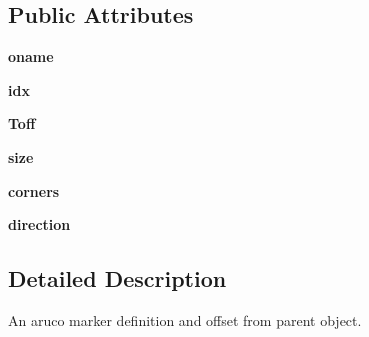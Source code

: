 \subsection*{Public Attributes}
\begin{DoxyCompactItemize}
\item 
\mbox{\label{classrnb-planning_1_1src_1_1pkg_1_1detector_1_1aruco_1_1detector_1_1_object_marker_a9fcba378061aff6c9628f649de8029a3}} 
{\bfseries oname}
\item 
\mbox{\label{classrnb-planning_1_1src_1_1pkg_1_1detector_1_1aruco_1_1detector_1_1_object_marker_ac0a5a0b449bc20e2a7c8b9627c227a2c}} 
{\bfseries idx}
\item 
\mbox{\label{classrnb-planning_1_1src_1_1pkg_1_1detector_1_1aruco_1_1detector_1_1_object_marker_a75d1818d75e95561d34838831c6dc3f5}} 
{\bfseries Toff}
\item 
\mbox{\label{classrnb-planning_1_1src_1_1pkg_1_1detector_1_1aruco_1_1detector_1_1_object_marker_a378ae8d2ae3702e80b64aa0faa39a09c}} 
{\bfseries size}
\item 
\mbox{\label{classrnb-planning_1_1src_1_1pkg_1_1detector_1_1aruco_1_1detector_1_1_object_marker_ad68ca82f6f34c35f7b841a29f0c3d5ce}} 
{\bfseries corners}
\item 
\mbox{\label{classrnb-planning_1_1src_1_1pkg_1_1detector_1_1aruco_1_1detector_1_1_object_marker_a7acb624e53966fd785100ec7ad2abb7b}} 
{\bfseries direction}
\end{DoxyCompactItemize}


\subsection{Detailed Description}
An aruco marker definition and offset from parent object. 


